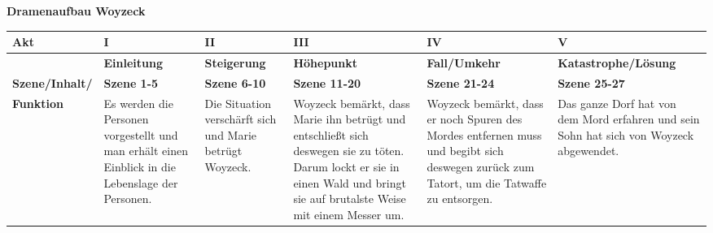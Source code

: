 \documentclass[12pt, a4paper]{report}
\begin{document}
	\thispagestyle{empty}
	\noindent
	\Huge
	\centering
	\textbf{Dramenaufbau Woyzeck}
	\normalsize
	\\[1cm]
	\begin{tabularx}{\textwidth}{|X|X|X|X|X|X|}
	 \hline
	 \textbf{Akt} & \textbf{I} & \textbf{II} & \textbf{III} & \textbf{IV} & \textbf{V} \\
	 \hline
	 & \textbf{Einleitung} & \textbf{Steigerung} & \textbf{Höhepunkt} & \textbf{Fall/Umkehr} & \textbf{Katastrophe/Lösung} \\
	 \hline
	 \textbf{Szene/Inhalt/} & \textbf{Szene 1-5} & \textbf{Szene 6-10} & \textbf{Szene 11-20} & \textbf{Szene 21-24} & \textbf{Szene 25-27} \\
	 \textbf{Funktion} & Es werden die Personen vorgestellt und man erhält einen Einblick in die Lebenslage der Personen. & Die Situation verschärft sich und Marie betrügt Woyzeck. & Woyzeck bemärkt, dass Marie ihn betrügt und entschließt sich deswegen sie zu töten. Darum lockt er sie in einen Wald und bringt sie auf brutalste Weise mit einem Messer um. & Woyzeck bemärkt, dass er noch Spuren des Mordes entfernen muss und begibt sich deswegen zurück zum Tatort, um die Tatwaffe zu entsorgen.& Das ganze Dorf hat von dem Mord erfahren und sein Sohn hat sich von Woyzeck abgewendet.\\
	 \hline
	\end{tabularx}
\end{document}
